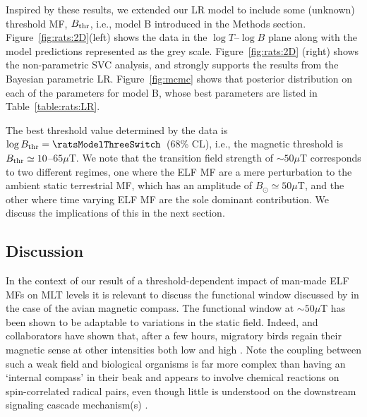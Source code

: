 \documentclass[letter]{article}
\begin{document}
 
Inspired by these results, we extended our LR model  to include  some (unknown) threshold MF, $B_{\rm thr}$, i.e., model B introduced in the Methods section. Figure~\ref{fig:rats:2D}(left) shows the data in the $\log T$--$\log B$ plane along with the model predictions represented as the grey scale. 
Figure~\ref{fig:rats:2D} (right) shows  the non-parametric SVC analysis, and strongly supports the results from the Bayesian parametric LR.
 Figure~\ref{fig:mcmc} shows that posterior distribution on each of the parameters for model B, whose best parameters are listed in Table~\ref{table:rats:LR}. 
 
 The best threshold value determined by the data is $\log B_{\rm thr}=\ratsModelThreeSwitch$\ratsModelThreeSwitchErr\ (68\% CL), i.e., the magnetic threshold is $B_{\rm thr}\simeq10$--$65\mu$T. %
 We note that the transition field  strength of $\sim50\mu$T   corresponds to
two different regimes, one where the ELF MF are a mere perturbation to the ambient static terrestrial MF, which has
an amplitude of $B_{\odot}\simeq50\mu$T, and the other where time varying ELF MF are the sole dominant contribution.  
We discuss the implications of this in the next section.


\subsection*{Discussion}
 \label{section:discussion}
 

In the context of our result of a threshold-dependent impact of man-made ELF MFs on MLT levels 
 it is relevant to  discuss the functional window discussed  by \citet{Wiltschko2014} 
in the case of the   avian magnetic compass. The functional window  at $\sim50\mu$T has been shown to be adaptable to variations in the static field.
Indeed, \citet{Wiltschko2014} and collaborators have shown that, after a few hours, migratory birds regain their magnetic sense at other intensities both low \citep[e.g.][as low as 4$\mu$T]{Winklhofer2013} and high \citep[][up to 92$\mu$T]{Wiltschko2006}. Note the coupling between such a weak field and biological organisms \citep[e.g.][]{ Kattnig2017,Hore2016,Ritz2000,Vanderstraeten2010,Vanderstraeten2018} is far more complex than having  an `internal compass' in their beak and appears to involve chemical reactions on spin-correlated radical pairs, even though  little is understood on the downstream signaling cascade mechanism(s)  \citep[as reviewed in][]{Nordmann2017}.
 
\end{document}

